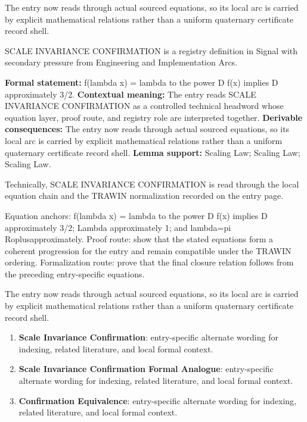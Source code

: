 The entry now reads through actual sourced equations, so its local arc is carried by explicit mathematical relations rather than a uniform quaternary certificate record shell.
\clearpage


\begingroup\small
{}
SCALE INVARIANCE CONFIRMATION is a registry definition in Signal with secondary pressure from Engineering and Implementation Arcs.

\begingroup\footnotesize\setlength{\emergencystretch}{3em}\sloppy
\textbf{Formal statement:} f(lambda x) = lambda to the power D f(x) implies D approximately 3/2. \textbf{Contextual meaning:} The entry reads SCALE INVARIANCE CONFIRMATION as a controlled technical headword whose equation layer, proof route, and registry role are interpreted together. \textbf{Derivable consequences:} The entry now reads through actual sourced equations, so its local arc is carried by explicit mathematical relations rather than a uniform quaternary certificate record shell. \textbf{Lemma support:} Scaling Law; Scaling Law; Scaling Law.\par
\endgroup

Technically, SCALE INVARIANCE CONFIRMATION is read through the local equation chain and the TRAWIN normalization recorded on the entry page.

Equation anchors: f(lambda x) = lambda to the power D f(x) implies D approximately 3/2; Lambda approximately 1; and lambda=pi Roplusapproximately. Proof route: show that the stated equations form a coherent progression for the entry and remain compatible under the TRAWIN ordering. Formalization route: prove that the final closure relation follows from the preceding entry-specific equations.

The entry now reads through actual sourced equations, so its local arc is carried by explicit mathematical relations rather than a uniform quaternary certificate record shell.
\endgroup

\begin{enumerate}[leftmargin=1.6em,itemsep=6pt,topsep=4pt]
\item \textbf{Scale Invariance Confirmation}: entry-specific alternate wording for indexing, related literature, and local formal context.
\item \textbf{Scale Invariance Confirmation Formal Analogue}: entry-specific alternate wording for indexing, related literature, and local formal context.
\item \textbf{Confirmation Equivalence}: entry-specific alternate wording for indexing, related literature, and local formal context.
\end{enumerate}

